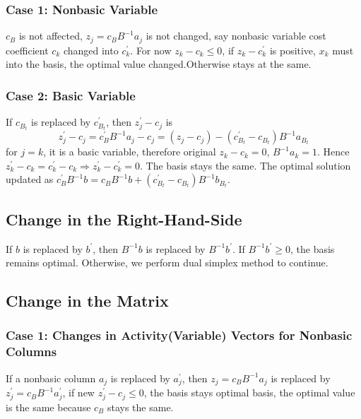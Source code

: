 				\subsubsection{Case 1: Nonbasic Variable}
					$c_B$ is not affected, $z_j = c_BB^{-1}a_j$ is not changed, say nonbasic variable cost coefficient $c_k$ changed into $c_k^{'}$. For now $z_k - c_k \le 0$, if $z_k - c_k^{'}$ is positive, $x_k$ must into the basis, the optimal value changed.Otherwise stays at the same.
				\subsubsection{Case 2: Basic Variable}
					If $c_{B_t}$ is replaced by $c_{B_t}^{'}$, then $z_j^{'}-c_j$ is
					\begin{equation}
						z_j^{'} - c_j = c_B^{'}B^{-1}a_j - c_j = (z_j - c_j) - (c_{B_t}^{'}-c_{B_t})B^{-1}a_{B_t} 
					\end{equation}
					for $j=k$, it is a basic variable, therefore original $z_k - c_k = 0$, $B^{-1}a_k=1$. Hence $z_k^{'}-c_k = c_k^{'} - c_k \Rightarrow z_k^{'} - c_k^{'} = 0$. The basis stays the same. The optimal solution updated as $c_B^{'}B^{-1}b=c_BB^{-1}b + (c_{B_t}^{'} - c_{B_t})B^{-1}b_{B_t}$.

			\subsection{Change in the Right-Hand-Side}
				If $b$ is replaced by $b^{'}$, then $B^{-1}b$ is replaced by $B^{-1}b^{'}$. If $B^{-1}b^{'} \ge 0$, the basis remains optimal. Otherwise, we perform dual simplex method to continue.

			\subsection{Change in the Matrix}
				\subsubsection{Case 1: Changes in Activity(Variable) Vectors for Nonbasic Columns}
					If a nonbasic column $a_j$ is replaced by $a_j^{'}$, then $z_j=c_BB^{-1}a_j$ is replaced by $z_j^{'}=c_BB^{-1}a_j^{'}$, if new $z_j^{'} - c_j \le 0$, the basis stays optimal basis, the optimal value is the same because $c_B$ stays the same.

